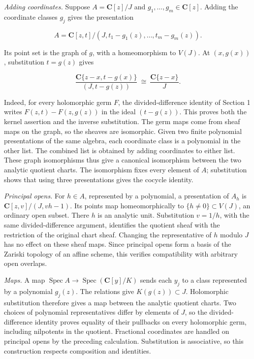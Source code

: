 \documentclass[11pt]{article}
\begin{document}
\emph{Adding coordinates.} Suppose \(A=\mathbf C[z]/J\) and
\(g_1,\ldots,g_m\in\mathbf C[z]\). Adding the coordinate classes \(g_j\)
gives the presentation

\[
A=\mathbf C[z,t]/(J,t_1-g_1(z),\ldots,t_m-g_m(z)).
\]

Its point set is the graph of \(g\), with a homeomorphism to \(V(J)\).
At \((x,g(x))\), substitution \(t=g(z)\) gives

\[
\frac{\mathbf C\{z-x,t-g(x)\}}{(J,t-g(z))}
\ \cong\ \frac{\mathbf C\{z-x\}}{J}.
\]

Indeed, for every holomorphic germ \(F\), the divided-difference
identity of Section 1 writes \(F(z,t)-F(z,g(z))\) in the ideal
\((t-g(z))\). This proves both the kernel assertion and the inverse
substitution. The germ maps come from sheaf maps on the graph, so the
sheaves are isomorphic. Given two finite polynomial presentations of the
same algebra, each coordinate class is a polynomial in the other list.
The combined list is obtained by adding coordinates to either list.
These graph isomorphisms thus give a canonical isomorphism between the
two analytic quotient charts. The isomorphism fixes every element of
\(A\); substitution shows that using three presentations gives the
cocycle identity.

\emph{Principal opens.} For \(h\in A\), represented by a polynomial, a
presentation of \(A_h\) is \(\mathbf C[z,v]/(J,vh-1)\). Its points map
homeomorphically to \(\{h\ne0\}\subset V(J)\), an ordinary open subset.
There \(h\) is an analytic unit. Substitution \(v=1/h\), with the same
divided-difference argument, identifies the quotient sheaf with the
restriction of the original chart sheaf. Changing the representative of
\(h\) modulo \(J\) has no effect on these sheaf maps. Since principal
opens form a basis of the Zariski topology of an affine scheme, this
verifies compatibility with arbitrary open overlaps.

\emph{Maps.} A map
\(\operatorname{Spec}A\to\operatorname{Spec}(\mathbf C[y]/K)\) sends
each \(y_j\) to a class represented by a polynomial \(g_j(z)\). The
relations give \(K(g(z))\subset J\). Holomorphic substitution therefore
gives a map between the analytic quotient charts. Two choices of
polynomial representatives differ by elements of \(J\), so the
divided-difference identity proves equality of their pullbacks on every
holomorphic germ, including nilpotents in the quotient. Fractional
coordinates are handled on principal opens by the preceding calculation.
Substitution is associative, so this construction respects composition
and identities.
\end{document}
